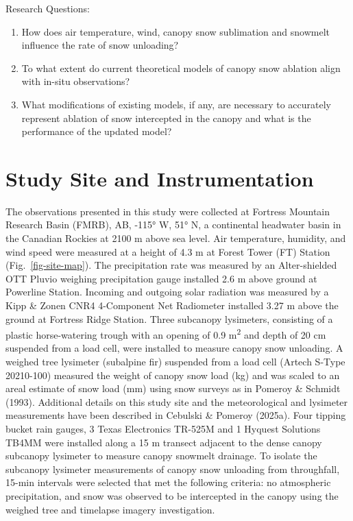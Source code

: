 \documentclass[
  letterpaper,
  DIV=11,
  numbers=noendperiod]{scrartcl}
\begin{document}
Research Questions:

\begin{enumerate}
\def\labelenumi{\arabic{enumi}.}
\item
  How does air temperature, wind, canopy snow sublimation and snowmelt
  influence the rate of snow unloading?
\item
  To what extent do current theoretical models of canopy snow ablation
  align with in-situ observations?
\item
  What modifications of existing models, if any, are necessary to
  accurately represent ablation of snow intercepted in the canopy and
  what is the performance of the updated model?
\end{enumerate}

\section{Study Site and
Instrumentation}\label{study-site-and-instrumentation}

The observations presented in this study were collected at Fortress
Mountain Research Basin (FMRB), AB, -115° W, 51° N, a continental
headwater basin in the Canadian Rockies at 2100 m above sea level. Air
temperature, humidity, and wind speed were measured at a height of 4.3 m
at Forest Tower (FT) Station (Fig.~\ref{fig-site-map}). The
precipitation rate was measured by an Alter-shielded OTT Pluvio weighing
precipitation gauge installed 2.6 m above ground at Powerline Station.
Incoming and outgoing solar radiation was measured by a Kipp \& Zonen
CNR4 4-Component Net Radiometer installed 3.27 m above the ground at
Fortress Ridge Station. Three subcanopy lysimeters, consisting of a
plastic horse-watering trough with an opening of 0.9
m\textsuperscript{2} and depth of 20 cm suspended from a load cell, were
installed to measure canopy snow unloading. A weighed tree lysimeter
(subalpine fir) suspended from a load cell (Artech S-Type 20210-100)
measured the weight of canopy snow load (kg) and was scaled to an areal
estimate of snow load (mm) using snow surveys as in Pomeroy \& Schmidt
(1993). Additional details on this study site and the meteorological and
lysimeter measurements have been described in Cebulski \& Pomeroy
(2025a). Four tipping bucket rain gauges, 3 Texas Electronics TR-525M
and 1 Hyquest Solutions TB4MM were installed along a 15 m transect
adjacent to the dense canopy subcanopy lysimeter to measure canopy
snowmelt drainage. To isolate the subcanopy lysimeter measurements of
canopy snow unloading from throughfall, 15-min intervals were selected
that met the following criteria: no atmospheric precipitation, and snow
was observed to be intercepted in the canopy using the weighed tree and
timelapse imagery investigation.
\end{document}
